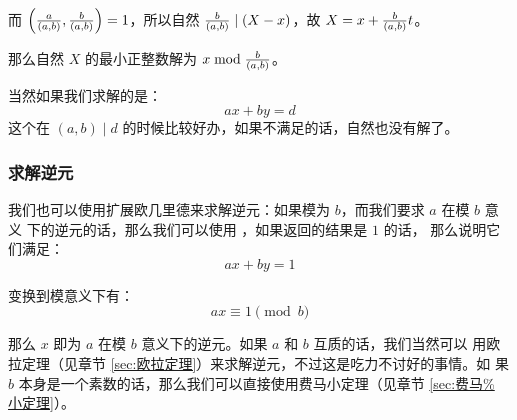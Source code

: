 而 $\left({a \over (a, b)}, {b \over (a, b)}\right) = 1$，所以自然 ${b \over (a,
b)} \mid (X - x)$，故 $X = x + {b \over (a, b)} t$。

那么自然 $X$ 的最小正整数解为 $x \bmod {b \over (a, b)}$。

当然如果我们求解的是：\[
    ax + by = d
\]这个在 $(a, b) \mid d$ 的时候比较好办，如果不满足的话，自然也没有解了。



\subsubsection{求解逆元}

我们也可以使用扩展欧几里德来求解逆元：如果模为 $b$，而我们要求 $a$ 在模 $b$ 意义
下的逆元的话，那么我们可以使用 ，如果返回的结果是 $1$ 的话，
那么说明它们满足：\[
    ax + by = 1
\]

变换到模意义下有：\[
    ax \equiv 1 \pmod b
\]

那么 $x$ 即为 $a$ 在模 $b$ 意义下的逆元。如果 $a$ 和 $b$ 互质的话，我们当然可以
用欧拉定理（见章节 \ref{sec:欧拉定理}）来求解逆元，不过这是吃力不讨好的事情。如
果 $b$ 本身是一个素数的话，那么我们可以直接使用费马小定理（见章节 \ref{sec:费马%
小定理}）。



